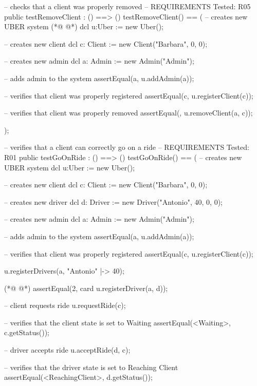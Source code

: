 \begin{vdmpp}[breaklines=true]
  -- checks that a client was properly removed
  -- REQUIREMENTS Tested: R05 
  public testRemoveClient : () ==> ()
   testRemoveClient() == (
    -- creates new UBER system
(*@
\label{testGoOnRide:69}
@*)
     dcl u:Uber := new Uber();
     
     -- creates new client
     dcl c: Client := new Client("Barbara", 0, 0);
     
     -- creates new admin
     dcl a: Admin := new Admin("Admin");
   
     -- adds admin to the system
     assertEqual({a}, u.addAdmin(a));
     
     -- verifies that client was properly registered
     assertEqual({c}, u.registerClient(c));
     
     -- verifies that client was properly removed
     assertEqual({}, u.removeClient(a, c));
     
     
   );
  
  -- verifies that a client can correctly go on a ride
  -- REQUIREMENTS Tested: R01
  public testGoOnRide : () ==> ()
   testGoOnRide() == (
    -- creates new UBER system
     dcl u:Uber := new Uber();
     
     -- creates new client
     dcl c: Client := new Client("Barbara", 0, 0);
     
     -- creates new driver
    dcl d: Driver := new Driver("Antonio", 40, 0, 0);
    
    -- creates new admin
     dcl a: Admin := new Admin("Admin");
   
     -- adds admin to the system
     assertEqual({a}, u.addAdmin(a));
     
     -- verifies that client was properly registered
     assertEqual({c}, u.registerClient(c));
     
     
     
      u.registerDrivers(a, {"Antonio" |-> 40});
      
(*@
\label{testTakeOnRide:115}
@*)
      assertEqual(2, card u.registerDriver(a, d));
     
     -- client requests ride
     u.requestRide(c);
     
     -- verifies that the client state is set to Waiting
     assertEqual(<Waiting>, c.getStatus());
     
     -- driver accepts ride
     u.acceptRide(d, c);
     
     -- verifies that the driver state is set to Reaching Client
     assertEqual(<ReachingClient>, d.getStatus());
     

\end{vdmpp}
